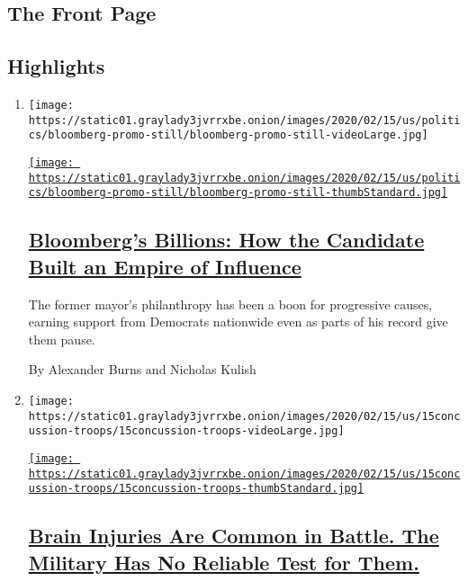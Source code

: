 \hypertarget{the-front-page}{%
\subsection{The Front Page}\label{the-front-page}}

\hypertarget{highlights}{%
\subsection{Highlights}\label{highlights}}

\begin{enumerate}
\def\labelenumi{\arabic{enumi}.}
\item
  \texttt{[image: https://static01.graylady3jvrrxbe.onion/images/2020/02/15/us/politics/bloomberg-promo-still/bloomberg-promo-still-videoLarge.jpg]}

  \href{/interactive/2020/02/15/us/politics/michael-bloomberg-spending.html}{\texttt{[image: https://static01.graylady3jvrrxbe.onion/images/2020/02/15/us/politics/bloomberg-promo-still/bloomberg-promo-still-thumbStandard.jpg]}}

  \hypertarget{bloombergs-billions-how-the-candidate-built-an-empire-of-influence}{%
  \subsection{\texorpdfstring{\href{/interactive/2020/02/15/us/politics/michael-bloomberg-spending.html}{Bloomberg's
  Billions: How the Candidate Built an Empire of
  Influence}}{Bloomberg's Billions: How the Candidate Built an Empire of Influence}}\label{bloombergs-billions-how-the-candidate-built-an-empire-of-influence}}

  The former mayor's philanthropy has been a boon for progressive
  causes, earning support from Democrats nationwide even as parts of his
  record give them pause.

  By Alexander Burns and Nicholas Kulish
\item
  \texttt{[image: https://static01.graylady3jvrrxbe.onion/images/2020/02/15/us/15concussion-troops/15concussion-troops-videoLarge.jpg]}

  \href{/2020/02/15/us/brain-injuries-military.html}{\texttt{[image: https://static01.graylady3jvrrxbe.onion/images/2020/02/15/us/15concussion-troops/15concussion-troops-thumbStandard.jpg]}}

  \hypertarget{brain-injuries-are-common-in-battle-the-military-has-no-reliable-test-for-them}{%
  \subsection{\texorpdfstring{\href{/2020/02/15/us/brain-injuries-military.html}{Brain
  Injuries Are Common in Battle. The Military Has No Reliable Test for
  Them.}}{Brain Injuries Are Common in Battle. The Military Has No Reliable Test for Them.}}\label{brain-injuries-are-common-in-battle-the-military-has-no-reliable-test-for-them}}


\end{enumerate}
